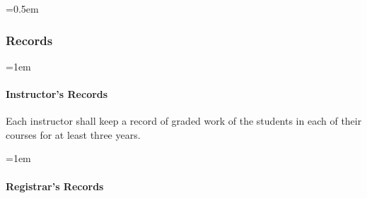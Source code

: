 \documentclass{manual}
\let\oldsubsubsection\subsubsection
\renewcommand\subsubsection{\leftskip=0.5em\oldsubsubsection}
\let\oldparagraph\paragraph
\renewcommand\paragraph{\leftskip=1em\oldparagraph}
\begin{document}
\subsubsection{Records}

\paragraph{Instructor's Records}

Each instructor shall keep a record of graded work of the students in each of their courses for at least three years.

\paragraph{Registrar's Records}
\end{document}
